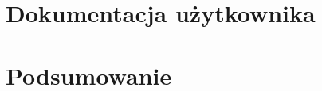 \documentclass[a4paper,onecolumn,twoside,12pt]{mwrep}
\begin{document}
\setcounter{page}{1}
\pagestyle{plain}
\tableofcontents






\chapter{Dokumentacja użytkownika}
\chapter{Podsumowanie}


\listoffigures
\listoftables
\lstlistoflistings
\end{document}
